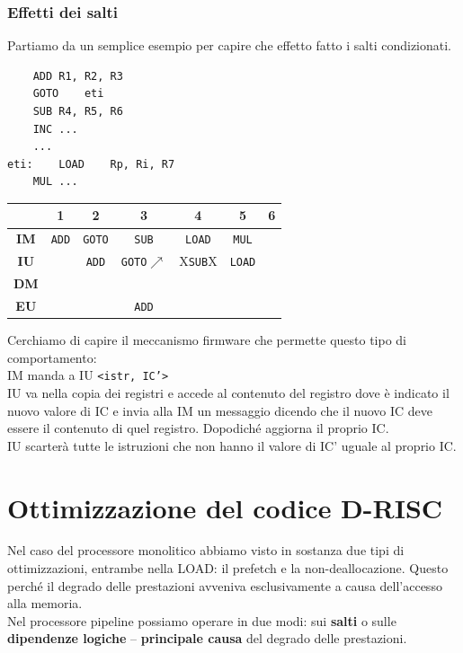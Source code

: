 \documentclass[10pt]{report}
\begin{document}
\subsubsection{Effetti dei salti}
Partiamo da un semplice esempio per capire che effetto fatto i salti condizionati.
\begin{multicols}{2}
\begin{lstlisting}
	ADD	R1, R2, R3
	GOTO	eti
	SUB	R4, R5, R6
	INC ...
	...
eti:	LOAD	Rp, Ri, R7
	MUL ...
\end{lstlisting}
\columnbreak

\begin{tabular}{c|c|c|c|c|c|c|}
	 & 1 & 2 & 3 & 4 & 5 & 6 \\
	\hline
	\textbf{IM} & \texttt{ADD} & \texttt{GOTO} & \texttt{SUB} & \texttt{LOAD} & \texttt{MUL} & \\
	\hline
	\textbf{IU} & & \texttt{ADD} & \texttt{GOTO}$\nearrow$ & X\texttt{SUB}X & \texttt{LOAD} & \\
	\hline
	\textbf{DM} & & & & & & \\
	\hline
	\textbf{EU} & & & \texttt{ADD} & & & \\
	\hline
\end{tabular}
\end{multicols}
Cerchiamo di capire il meccanismo firmware che permette questo tipo di comportamento:\\
IM manda a IU \texttt{<istr, IC'>}\\
IU va nella copia dei registri e accede al contenuto del registro dove è indicato il nuovo valore di IC e invia alla IM un messaggio dicendo che il nuovo IC deve essere il contenuto di quel registro. Dopodiché aggiorna il proprio IC.\\
IU scarterà tutte le istruzioni che non hanno il valore di IC' uguale al proprio IC.
\pagebreak
\section{Ottimizzazione del codice D-RISC}
Nel caso del processore monolitico abbiamo visto in sostanza due tipi di ottimizzazioni, entrambe nella LOAD: il prefetch e la non-deallocazione. Questo perché il degrado delle prestazioni avveniva esclusivamente a causa dell'accesso alla memoria.\\
Nel processore pipeline possiamo operare in due modi: sui \textbf{salti} o sulle \textbf{dipendenze logiche} -- \textbf{principale causa} del degrado delle prestazioni.
\end{document}
